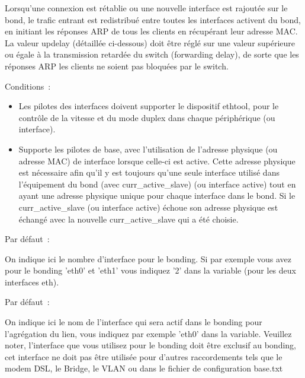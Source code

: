 \begin{description}
\begin{description}
  Lorsqu'une connexion est rétablie ou une nouvelle interface est rajoutée sur le
  bond, le trafic entrant est redistribué entre toutes les interfaces activent du
  bond, en initiant les réponses ARP de tous les clients en récupérant leur adresse
  MAC. La valeur updelay (détaillée ci-dessous) doit être réglé sur une valeur supérieure
  ou égale à la transmission retardée du switch (forwarding delay), de sorte que les
  réponses ARP les clients ne soient pas bloquées par le switch.

  Conditions~:

  \begin{itemize}

    \item Les pilotes des interfaces doivent supporter le dispositif ethtool,
          pour le contrôle de la vitesse et du mode duplex dans chaque périphérique
          (ou interface).

    \item Supporte les pilotes de base, avec l'utilisation de l'adresse physique
          (ou adresse MAC) de interface lorsque celle-ci est active. Cette adresse
          physique est nécessaire afin qu'il y est toujours qu'une seule interface
          utilisé dans l'équipement du bond (avec curr\_active\_slave) (ou interface
          active) tout en ayant une adresse physique unique pour chaque interface dans
          le bond. Si le curr\_active\_slave (ou interface active) échoue son adresse
          physique est échangé avec la nouvelle curr\_active\_slave qui a été choisie.

  \end{itemize}

\end{description}


  Par défaut~: 

  On indique ici le nombre d'interface pour le bonding. Si par exemple vous avez
  pour le bonding 'eth0' et 'eth1' vous indiquez '2' dans la variable (pour les
  deux interfaces eth).


  Par défaut~: 

  On indique ici le nom de l'interface qui sera actif dans le bonding pour
  l'agrégation du lien, vous indiquez par exemple 'eth0' dans la variable.
  Veuillez noter, l'interface que vous utilisez pour le bonding doit être
  exclusif au bonding, cet interface ne doit pas être utilisée pour d'autres
  raccordements tels que le modem DSL, le Bridge, le VLAN ou dans le fichier
  de configuration base.txt


\end{description}
